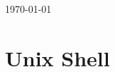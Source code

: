 \documentclass{article}
\begin{document}
\begin{titlepage}
	
	
	\vfill\vfill\vfill %
	
	{\large\today} %
	
	
	 
	
	\vfill %
	
\end{titlepage}


\newpage
  \tableofcontents
\newpage  
{}


\section{Unix Shell}
\end{document}
